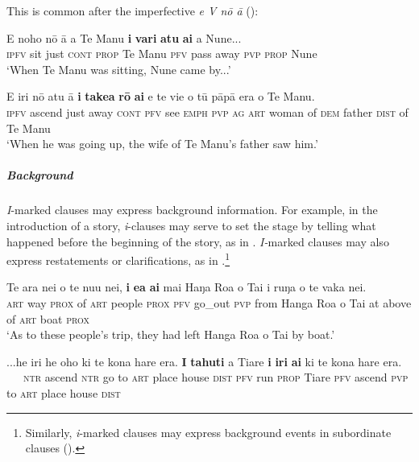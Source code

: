 This is common after the imperfective \textit{e V nō {\ꞌ}ā} ():

\ea\label{ex:7.22}
\gll E noho nō {\ꞌ}ā a Te Manu \textbf{i} \textbf{vari} \textbf{atu} \textbf{ai} a Nune... \\
\textsc{ipfv} sit just \textsc{cont} \textsc{prop} Te Manu \textsc{pfv} pass away \textsc{pvp} \textsc{prop} Nune \\

\glt 
‘When Te Manu was sitting, Nune came by...’ \textstyleExampleref{[R245.174]} 
\z

\ea\label{ex:7.23}
\gll E iri nō atu {\ꞌ}ā \textbf{i} \textbf{take{\ꞌ}a} \textbf{rō} \textbf{ai} e te vi{\ꞌ}e o tū pāpā era o Te Manu.\\
\textsc{ipfv} ascend just away \textsc{cont} \textsc{pfv} see \textsc{emph} \textsc{pvp} \textsc{ag} \textsc{art} woman of \textsc{dem} father \textsc{dist} of Te Manu\\

\glt 
‘When he was going up, the wife of Te Manu’s father saw him.’ \textstyleExampleref{[R245.214]} 
\z

\subparagraph{Background} \textit{I}{}-marked clauses may express background information. For example, in the introduction of a story, \textit{i}{}-clauses may serve to set the stage by telling what happened before the beginning of the story, as in . \textit{I-}marked clauses may also express restatements or clarifications, as in .\footnote{\label{fn:321}Similarly, \textit{i}{}-marked clauses may express background events in subordinate clauses ().}

\ea\label{ex:7.24}
\gll Te ara nei o te nu{\ꞌ}u nei, \textbf{i} \textbf{e{\ꞌ}a} \textbf{ai} mai Haŋa Roa o Tai  {\ꞌ}i ruŋa o te vaka nei.\\
\textsc{art} way \textsc{prox} of \textsc{art} people \textsc{prox} \textsc{pfv} go\_out \textsc{pvp} from Hanga Roa o Tai  at above of \textsc{art} boat \textsc{prox}\\

\glt 
‘As to these people’s trip, they had left Hanga Roa o Tai by boat.’ \textstyleExampleref{[R361.004]} 
\z

\ea\label{ex:7.25}
\gll ...he iri he oho ki te kona hare era. \textbf{I} \textbf{tahuti} a Tiare  \textbf{i} \textbf{iri} \textbf{ai} ki te kona hare era.\\
~~~\textsc{ntr} ascend \textsc{ntr} go to \textsc{art} place house \textsc{dist} \textsc{pfv} run \textsc{prop} Tiare  \textsc{pfv} ascend \textsc{pvp} to \textsc{art} place house \textsc{dist}\\

